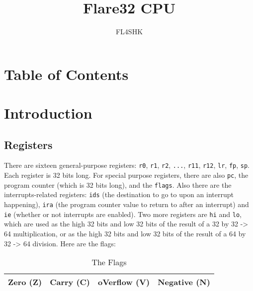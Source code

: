 \documentclass{article}
\title{Flare32 CPU}
\author{FL4SHK}
\makeatletter
\renewcommand\tableofcontents{%
    \@starttoc{toc}%
}
\makeatother
\begin{document}
	\maketitle
	\newpage



	\newpage
	\singlespacing
	\section{Table of Contents}
	\tableofcontents
	\newpage

	\doublespacing
	\section{Introduction}
	\subsection{Registers}
	There are sixteen general-purpose registers:  \texttt{r0}, \texttt{r1},
	\texttt{r2}, \texttt{...}, \texttt{r11}, \texttt{r12}, \texttt{lr},
	\texttt{fp}, \texttt{sp}.  Each register
	is 32 bits long.  For special purpose registers, there are also
	\texttt{pc}, the program counter (which is 32 bits long), and the
	\texttt{flags}.  Also there are the interrupts-related registers:
	\texttt{ids} (the destination to go to upon an interrupt happening),
	\texttt{ira} (the program counter value to return to after an
	interrupt) and \texttt{ie} (whether or not interrupts are enabled).
	Two more registers are \texttt{hi} and \texttt{lo}, which are used as
	the high 32 bits and low 32 bits of the result of a 32 by 32 -> 64
	multiplication, or as the high 32 bits and low 32 bits of the result of
	a 64 by 32 -> 64 division.  Here are the flags:

	\begin{table}[H]
		\begin{center}
			\caption{The Flags}
			\label{tab:flags}
			\begin{tabular}{|c|c|c|c|}
				\hline
				Zero (Z) & Carry (C) & oVerflow (V) & Negative (N)\\
				\hline
			\end{tabular}
		\end{center}
	\end{table}
\end{document}
